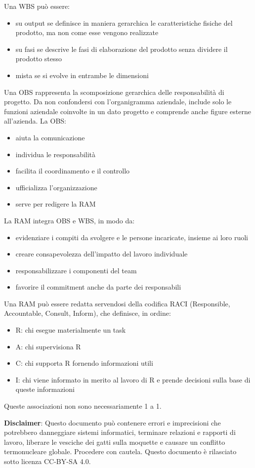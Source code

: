 \documentclass[answers, a4paper, 11pt]{exam}
\begin{document}
\begin{questions}
\begin{parts}
\begin{solution}
Una WBS può essere:
\begin{itemize}
    \item su output se definisce in maniera gerarchica le caratteristiche fisiche del prodotto, ma non come esse vengono realizzate
    \item su fasi se descrive le fasi di elaborazione del prodotto senza dividere il prodotto stesso
    \item mista se si evolve in entrambe le dimensioni
\end{itemize}

Una OBS rappresenta la scomposizione gerarchica delle responsabilità di progetto.
Da non confondersi con l'organigramma aziendale, include solo le funzioni aziendale coinvolte in un dato progetto e comprende anche figure esterne all'azienda.
La OBS:
\begin{itemize}
    \item aiuta la comunicazione
    \item individua le responsabilità
    \item facilita il coordinamento e il controllo
    \item ufficializza l'organizzazione
    \item serve per redigere la RAM
\end{itemize}


La RAM integra OBS e WBS, in modo da:
\begin{itemize}
    \item evidenziare i compiti da svolgere e le persone incaricate, insieme ai loro ruoli
    \item creare consapevolezza dell'impatto del lavoro individuale
    \item responsabilizzare i componenti del team
    \item favorire il commitment anche da parte dei responsabili
\end{itemize}
Una RAM può essere redatta servendosi della codifica RACI (Responsible, Accountable, Consult, Inform), che definisce, in ordine:
\begin{itemize}
    \item R: chi esegue materialmente un task
    \item A: chi supervisiona R
    \item C: chi supporta R fornendo informazioni utili
    \item I: chi viene informato in merito al lavoro di R e prende decisioni sulla base di queste informazioni
\end{itemize}

Queste associazioni non sono necessariamente 1 a 1.

\end{solution}
\end{parts}
\end{questions}
\textbf{Disclaimer}:  Questo documento può contenere errori e imprecisioni che potrebbero danneggiare sistemi informatici, terminare relazioni e rapporti di lavoro, liberare le vesciche dei gatti sulla moquette e causare un conflitto termonucleare globale.
Procedere con cautela.
Questo documento è rilasciato sotto licenza CC-BY-SA 4.0. \ccbysa
\end{document}
